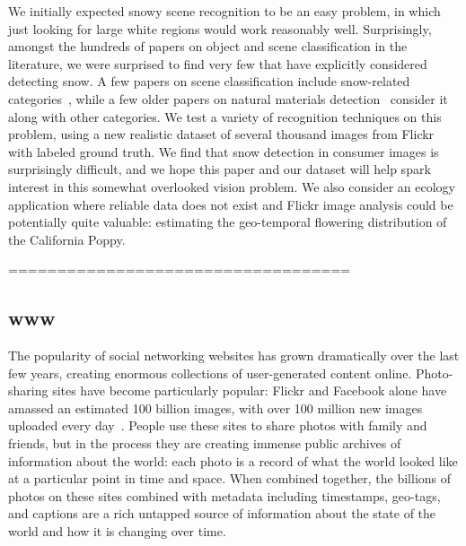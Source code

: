We initially expected snowy scene recognition to be an easy problem,
in which just looking for large white regions
would work reasonably well.  Surprisingly, amongst the hundreds of
papers on object and scene classification in the literature, we were
surprised to find very few that have explicitly considered detecting
snow. A few papers on scene classification include
snow-related
categories~\cite{XiaoHEOT10,li2007event,li2009totalscene}, while a few
older papers on natural materials
detection~\cite{luo2003spatialcontext,boutell2006semanticfeature}
consider it along with other categories. We test a variety of
recognition techniques on this problem, using a new realistic dataset
of several thousand  images from Flickr with labeled ground
truth.  We find that snow detection in consumer images is 
surprisingly difficult, and we hope this paper and our dataset
will help spark interest in this somewhat overlooked vision problem.
%
We also consider an ecology application where reliable data does not
exist and Flickr image analysis could be potentially quite valuable: estimating the geo-temporal flowering distribution of the
California Poppy.  




\hfill \break
\hfill \break
===================================
\hfill \break
\hfill \break
\subsection*{www}


The popularity of social networking websites has grown dramatically
over the last few years, creating enormous collections of
user-generated content online. Photo-sharing sites have become
particularly popular: Flickr and Facebook alone have amassed an
estimated 100 billion images, with over 100 million new images
uploaded every day~\cite{Kremerskothen11}.  People use these
sites to share photos with family and friends, but in the process they
are creating immense public archives of information about the world:
each photo is a record of what the world looked like at a particular
point in time and space.  When combined together, the billions of
photos on these sites combined with metadata including timestamps,
geo-tags, and captions are a rich untapped source of information about
the state of the world and how it is changing over
time.

